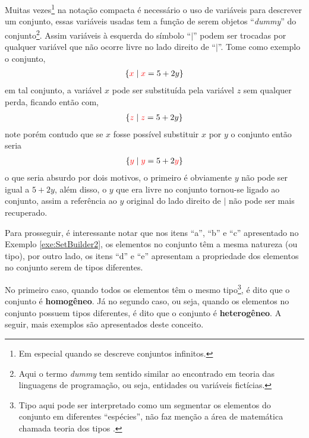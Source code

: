 \begin{nota}\label{note:DummyEmConjunto}
  Muitas vezes\footnote{Em especial quando se descreve conjuntos infinitos.} na notação compacta é necessário o uso de variáveis para descrever um conjunto, essas variáveis usadas tem a função de serem objetos ``\textit{dummy}'' do conjunto\footnote{Aqui o termo \textit{dummy} tem sentido similar ao encontrado em teoria das linguagens de programação, ou seja, entidades ou variáveis fictícias.}. Assim variáveis à esquerda do símbolo ``$\mid$'' podem ser trocadas por qualquer variável que não ocorre livre no lado direito de ``$\mid$''. Tome como exemplo o conjunto, 
  \begin{eqnarray*}
    \{{\color{red}x} \mid {\color{red}x} = 5 + 2y\}
  \end{eqnarray*}
  em tal conjunto, a variável $x$ pode ser substituída pela variável $z$ sem qualquer perda, ficando então com,
  \begin{eqnarray*}
    \{{\color{red}z} \mid {\color{red}z} = 5 + 2y\}
  \end{eqnarray*}
  note porém contudo que se $x$ fosse possível substituir $x$ por $y$ o conjunto então seria
  \begin{eqnarray*}
    \{{\color{red}y} \mid {\color{red}y} = 5 + 2{\color{red}y}\}
  \end{eqnarray*}
  o que seria absurdo por dois motivos, o primeiro é obviamente $y$ não pode ser igual a $5 + 2y$, além disso, o $y$ que era livre no conjunto tornou-se ligado ao conjunto, assim a referência ao $y$ original do lado direito de $\mid$ não pode ser mais recuperado.
\end{nota}

Para prosseguir, é interessante notar que nos itens ``a'', ``b'' e ``c'' apresentado no Exemplo \ref{exe:SetBuilder2}, os elementos no conjunto têm a mesma natureza (ou tipo), por outro lado, os itens ``d'' e ``e'' apresentam a propriedade dos elementos no conjunto serem de tipos diferentes. 

No primeiro caso, quando todos os elementos têm o mesmo tipo\footnote{Tipo aqui pode ser interpretado como um segmentar os elementos do conjunto em diferentes ``espécies'', não faz menção a área de matemática chamada teoria dos tipos \cite{nederpelt2014}.}, é dito que o conjunto é \textbf{homogêneo}. Já no segundo caso, ou seja, quando os elementos no conjunto possuem tipos diferentes, é dito que o conjunto é \textbf{heterogêneo}. A seguir, mais exemplos são apresentados deste conceito.

